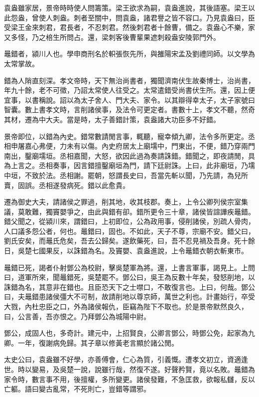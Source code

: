 袁盎雖家居，景帝時時使人問籌策。梁王欲求為嗣，袁盎進說，其後語塞。梁王以此怨盎，曾使人刺盎。刺者至關中，問袁盎，諸君譽之皆不容口。乃見袁盎曰，臣受梁王金來刺君，君長者，不忍刺君。然後刺君者十餘曹，備之。袁盎心不樂，家又多怪，乃之棓生所問占。還，梁刺客後曹輩果遮刺殺盎安陵郭門外。

鼂錯者，潁川人也。學申商刑名於軹張恢先所，與雒陽宋孟及劉禮同師。以文學為太常掌故。

錯為人陗直刻深。孝文帝時，天下無治尚書者，獨聞濟南伏生故秦博士，治尚書，年九十餘，老不可徵，乃詔太常使人往受之。太常遣錯受尚書伏生所。還，因上便宜事，以書稱說。詔以為太子舍人、門大夫、家令。以其辯得幸太子，太子家號曰智囊。數上書孝文時，言削諸侯事，及法令可更定者。書數十上，孝文不聽，然奇其材，遷為中大夫。當是時，太子善錯計策，袁盎諸大功臣多不好錯。

景帝即位，以錯為內史。錯常數請閒言事，輒聽，寵幸傾九卿，法令多所更定。丞相申屠嘉心弗便，力未有以傷。內史府居太上廟壖中，門東出，不便，錯乃穿兩門南出，鑿廟壖垣。丞相嘉聞，大怒，欲因此過為奏請誅錯。錯聞之，即夜請閒，具為上言之。丞相奏事，因言錯擅鑿廟垣為門，請下廷尉誅。上曰，此非廟垣，乃壖中垣，不致於法。丞相謝。罷朝，怒謂長史曰，吾當先斬以聞，乃先請，為兒所賣，固誤。丞相遂發病死。錯以此愈貴。

遷為御史大夫，請諸侯之罪過，削其地，收其枝郡。奏上，上令公卿列侯宗室集議，莫敢難，獨竇嬰爭之，由此與錯有卻。錯所更令三十章，諸侯皆諠譁疾鼂錯。錯父聞之，從潁川來，謂錯曰，上初即位，公為政用事，侵削諸侯，別疏人骨肉，人口議多怨公者，何也。鼂錯曰，固也。不如此，天子不尊，宗廟不安。錯父曰，劉氏安矣，而鼂氏危矣，吾去公歸矣。遂飲藥死，曰，吾不忍見禍及吾身。死十餘日，吳楚七國果反，以誅錯為名。及竇嬰、袁盎進說，上令鼂錯衣朝衣斬東市。

鼂錯已死，謁者仆射鄧公為校尉，擊吳楚軍為將。還，上書言軍事，謁見上。上問曰，道軍所來，聞鼂錯死，吳楚罷不。鄧公曰，吳王為反數十年矣，發怒削地，以誅錯為名，其意非在錯也。且臣恐天下之士噤口，不敢復言也。上曰，何哉。鄧公曰，夫鼂錯患諸侯彊大不可制，故請削地以尊京師，萬世之利也。計畫始行，卒受大戮，內杜忠臣之口，外為諸侯報仇，臣竊為陛下不取也。於是景帝默然良久，曰，公言善，吾亦恨之。乃拜鄧公為城陽中尉。

鄧公，成固人也，多奇計。建元中，上招賢良，公卿言鄧公，時鄧公免，起家為九卿。一年，復謝病免歸。其子章以修黃老言顯於諸公閒。

太史公曰，袁盎雖不好學，亦善傅會，仁心為質，引義慨。遭孝文初立，資適逢世。時以變易，及吳楚一說，說雖行哉，然復不遂。好聲矜賢，竟以名敗。鼂錯為家令時，數言事不用，後擅權，多所變更。諸侯發難，不急匡救，欲報私讎，反以亡軀。語曰變古亂常，不死則亡，豈錯等謂邪。